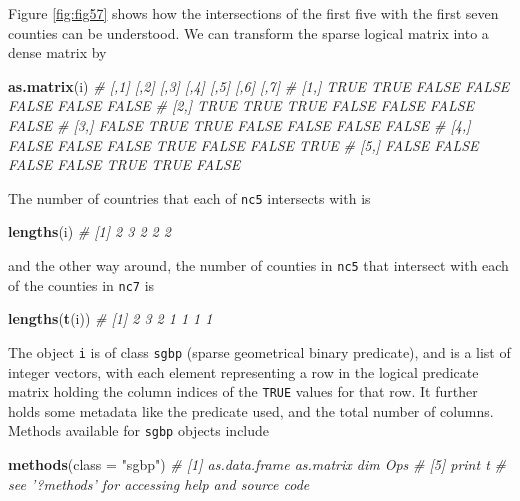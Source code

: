 \documentclass[]{book}
\newenvironment{Shaded}{\begin{snugshade}}{\end{snugshade}}
\newcommand{\CommentTok}[1]{\textcolor[rgb]{0.56,0.35,0.01}{\textit{#1}}}
\newcommand{\DataTypeTok}[1]{\textcolor[rgb]{0.13,0.29,0.53}{#1}}
\newcommand{\KeywordTok}[1]{\textcolor[rgb]{0.13,0.29,0.53}{\textbf{#1}}}
\newcommand{\NormalTok}[1]{#1}
\newcommand{\StringTok}[1]{\textcolor[rgb]{0.31,0.60,0.02}{#1}}
\begin{document}
Figure \ref{fig:fig57} shows how the intersections of the first
five with the first seven counties can be understood.
We can transform the sparse logical matrix into a dense matrix by

\begin{Shaded}
\begin{Highlighting}[]
\KeywordTok{as.matrix}\NormalTok{(i)}
\CommentTok{#       [,1]  [,2]  [,3]  [,4]  [,5]  [,6]  [,7]}
\CommentTok{# [1,]  TRUE  TRUE FALSE FALSE FALSE FALSE FALSE}
\CommentTok{# [2,]  TRUE  TRUE  TRUE FALSE FALSE FALSE FALSE}
\CommentTok{# [3,] FALSE  TRUE  TRUE FALSE FALSE FALSE FALSE}
\CommentTok{# [4,] FALSE FALSE FALSE  TRUE FALSE FALSE  TRUE}
\CommentTok{# [5,] FALSE FALSE FALSE FALSE  TRUE  TRUE FALSE}
\end{Highlighting}
\end{Shaded}

The number of countries that each of \texttt{nc5} intersects with is

\begin{Shaded}
\begin{Highlighting}[]
\KeywordTok{lengths}\NormalTok{(i)}
\CommentTok{# [1] 2 3 2 2 2}
\end{Highlighting}
\end{Shaded}

and the other way around, the number of counties in \texttt{nc5} that
intersect with each of the counties in \texttt{nc7} is

\begin{Shaded}
\begin{Highlighting}[]
\KeywordTok{lengths}\NormalTok{(}\KeywordTok{t}\NormalTok{(i))}
\CommentTok{# [1] 2 3 2 1 1 1 1}
\end{Highlighting}
\end{Shaded}

The object \texttt{i} is of class \texttt{sgbp} (sparse geometrical binary
predicate), and is a list of integer vectors, with each element
representing a row in the logical predicate matrix holding the column
indices of the \texttt{TRUE} values for that row. It further holds some
metadata like the predicate used, and the total number of columns.
Methods available for \texttt{sgbp} objects include

\begin{Shaded}
\begin{Highlighting}[]
\KeywordTok{methods}\NormalTok{(}\DataTypeTok{class =} \StringTok{"sgbp"}\NormalTok{)}
\CommentTok{# [1] as.data.frame as.matrix     dim           Ops          }
\CommentTok{# [5] print         t            }
\CommentTok{# see '?methods' for accessing help and source code}
\end{Highlighting}
\end{Shaded}
\end{document}
